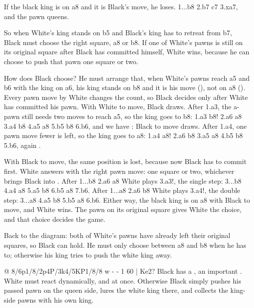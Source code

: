 If the black king is on a8 and it is Black's move, he loses.
1...\K b8 2.b7 \K c7 3.\K xa7, and the pawn queens.

So when White's king stands on b5 and Black's king has to retreat from b7, Black must choose the
right square, a8 or b8. If one of White's pawns is still on its original square after Black has
committed himself, White wins, because he can choose to push that pawn one square or two.

How does Black choose? He must arrange that, when White's pawns reach a5 and b6 with the king on
a6, his king stands on b8 and it is his move (), not on a8
(). Every pawn move by White changes the count, so Black decides only
after White has committed his pawn.
With White to move, Black draws. After 1.a3, the a-pawn still needs two moves to reach a5, so the
king goes to b8: 1.a3 \K b8! 2.\K a6 \K a8 3.a4 \K b8 4.a5 \K a8 5.b5 \K b8 6.b6, and we have
: Black to move draws. After 1.a4, one pawn move fewer is left, so the
king goes to a8: 1.a4 \K a8! 2.\K a6 \K b8 3.a5 \K a8 4.b5 \K b8 5.b6, again
.

With Black to move, the same position is lost, because now Black has to commit first. White answers
with the right pawn move: one square or two, whichever brings Black into
. After 1...\K b8 2.\K a6 \K a8 White plays 3.a3!, the single step:
3...\K b8 4.a4 \K a8 5.a5 \K b8 6.b5 \K a8 7.b6. After 1...\K a8 2.\K a6 \K b8 White plays 3.a4!, the
double step: 3...\K a8 4.a5 \K b8 5.b5 \K a8 6.b6. Either way, the black king is on a8 with Black to
move, and White wins. The pawn on its original square gives White the choice, and that choice
decides the game.

Back to the diagram: both of White's pawns have already left their original squares, so Black can
hold. He must only choose between a8 and b8 when he has to; otherwise his king tries to push the
white king away.

@ 8/6p1/8/2p4P/3k4/5KP1/8/8 w - - 1 60 | Ke2?
Black has a , an important
.
White must react dynamically, and at once. Otherwise Black simply pushes his passed pawn on the
queen side, lures the white king there, and collects the king-side pawns with his own king.


